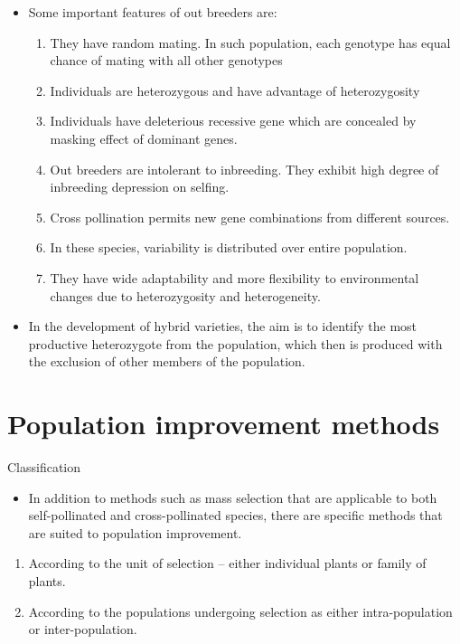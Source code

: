 \documentclass[11pt,ignorenonframetext,aspectratio=169]{beamer}
\providecommand{\tightlist}{%
  \setlength{\itemsep}{0pt}\setlength{\parskip}{0pt}}
\begin{document}
\begin{frame}{}
\protect\hypertarget{section-1}{}
\begin{itemize}
\tightlist
\item
  Some important features of out breeders are:

  \begin{enumerate}
  \tightlist
  \item
    They have random mating. In such population, each genotype has equal
    chance of mating with all other genotypes
  \item
    Individuals are heterozygous and have advantage of heterozygosity
  \item
    Individuals have deleterious recessive gene which are concealed by
    masking effect of dominant genes.
  \item
    Out breeders are intolerant to inbreeding. They exhibit high degree
    of inbreeding depression on selfing.
  \item
    Cross pollination permits new gene combinations from different
    sources.
  \item
    In these species, variability is distributed over entire population.
  \item
    They have wide adaptability and more flexibility to environmental
    changes due to heterozygosity and heterogeneity.
  \end{enumerate}
\item
  In the development of hybrid varieties, the aim is to identify the
  most productive heterozygote from the population, which then is
  produced with the exclusion of other members of the population.
\end{itemize}
\end{frame}

\hypertarget{population-improvement-methods}{%
\section{Population improvement
methods}\label{population-improvement-methods}}

\begin{frame}{Classification}
\protect\hypertarget{classification}{}
\begin{itemize}
\tightlist
\item
  In addition to methods such as mass selection that are applicable to
  both self-pollinated and cross-pollinated species, there are specific
  methods that are suited to population improvement.
\end{itemize}

\begin{enumerate}
\tightlist
\item
  According to the unit of selection -- either individual plants or
  family of plants.
\item
  According to the populations undergoing selection as either
  intra-population or inter-population.
\end{enumerate}
\end{frame}
\end{document}
